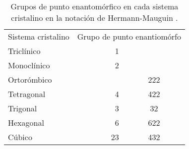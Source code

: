 \begin{table}[H]
\centering
\begin{tabular}{lrc}
\hline
\multicolumn{1}{c}{\multirow{2}{*}{Sistema cristalino}} & \multicolumn{2}{c}{\multirow{2}{*}{Grupo de punto enantiomórfo}} \\
\multicolumn{1}{c}{}                                    & \multicolumn{2}{c}{}                                             \\ \hline
Triclínico                                              & 1                              &                                 \\
Monoclínico                                             & 2                              &                                 \\
Ortorómbico                                             &                                & 222                             \\
Tetragonal                                              & 4                              & 422                             \\
Trigonal                                                & 3                              & 32                              \\
Hexagonal                                               & 6                              & 622                             \\
Cúbico                                                  & 23                             & 432                             \\ \hline
\end{tabular}
\caption{Grupos de punto enantomórfico en cada sistema cristalino en la notación de Hermann-Mauguin \cite{Hermann2015notation}.}
\label{Tab. quiral}
\end{table}